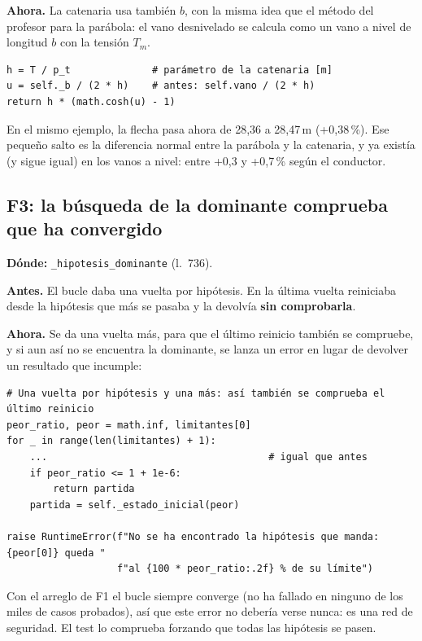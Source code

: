 \documentclass[11pt,a4paper]{article}
\newcommand{\code}[1]{\texttt{#1}}
\newcommand{\antes}[1]{\noindent\textcolor{antes}{\textbf{Antes.}} #1\par\smallskip}
\newcommand{\ahora}[1]{\noindent\textcolor{ahora}{\textbf{Ahora.}} #1\par\smallskip}
\begin{document}
\ahora{La catenaria usa también $b$, con la misma idea que el método del profesor para la parábola: el vano desnivelado se calcula como un vano a nivel de longitud $b$ con la tensión $T_m$.}

\begin{lstlisting}
h = T / p_t              # parámetro de la catenaria [m]
u = self._b / (2 * h)    # antes: self.vano / (2 * h)
return h * (math.cosh(u) - 1)
\end{lstlisting}

En el mismo ejemplo, la flecha pasa ahora de 28,36 a 28,47\,m (+0,38\,\%). Ese pequeño salto es la diferencia normal entre la parábola y la catenaria, y ya existía (y sigue igual) en los vanos a nivel: entre +0,3 y +0,7\,\% según el conductor.

\subsection{F3: la búsqueda de la dominante comprueba que ha convergido}

\noindent\textbf{Dónde:} \code{\_hipotesis\_dominante} (l.~736).\par\medskip

\antes{El bucle daba una vuelta por hipótesis. En la última vuelta reiniciaba desde la hipótesis que más se pasaba y la devolvía \textbf{sin comprobarla}.}

\ahora{Se da una vuelta más, para que el último reinicio también se compruebe, y si aun así no se encuentra la dominante, se lanza un error en lugar de devolver un resultado que incumple:}

\begin{lstlisting}
# Una vuelta por hipótesis y una más: así también se comprueba el último reinicio
peor_ratio, peor = math.inf, limitantes[0]
for _ in range(len(limitantes) + 1):
    ...                                      # igual que antes
    if peor_ratio <= 1 + 1e-6:
        return partida
    partida = self._estado_inicial(peor)

raise RuntimeError(f"No se ha encontrado la hipótesis que manda: {peor[0]} queda "
                   f"al {100 * peor_ratio:.2f} % de su límite")
\end{lstlisting}

Con el arreglo de F1 el bucle siempre converge (no ha fallado en ninguno de los miles de casos probados), así que este error no debería verse nunca: es una red de seguridad. El test lo comprueba forzando que todas las hipótesis se pasen.
\end{document}
